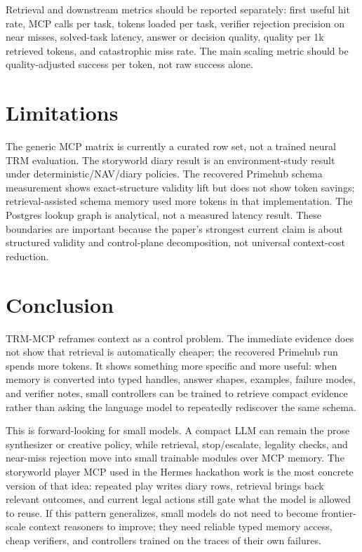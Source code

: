 \documentclass[11pt]{article}
\begin{document}
Retrieval and downstream metrics should be reported separately: first useful hit rate, MCP calls per task, tokens loaded per task, verifier rejection precision on near misses, solved-task latency, answer or decision quality, quality per 1k retrieved tokens, and catastrophic miss rate. The main scaling metric should be quality-adjusted success per token, not raw success alone.

\section{Limitations}

The generic MCP matrix is currently a curated row set, not a trained neural TRM evaluation. The storyworld diary result is an environment-study result under deterministic/NAV/diary policies. The recovered Primehub schema measurement shows exact-structure validity lift but does not show token savings; retrieval-assisted schema memory used more tokens in that implementation. The Postgres lookup graph is analytical, not a measured latency result. These boundaries are important because the paper's strongest current claim is about structured validity and control-plane decomposition, not universal context-cost reduction.

\section{Conclusion}

TRM-MCP reframes context as a control problem. The immediate evidence does not show that retrieval is automatically cheaper; the recovered Primehub run spends more tokens. It shows something more specific and more useful: when memory is converted into typed handles, answer shapes, examples, failure modes, and verifier notes, small controllers can be trained to retrieve compact evidence rather than asking the language model to repeatedly rediscover the same schema.

This is forward-looking for small models. A compact LLM can remain the prose synthesizer or creative policy, while retrieval, stop/escalate, legality checks, and near-miss rejection move into small trainable modules over MCP memory. The storyworld player MCP used in the Hermes hackathon work is the most concrete version of that idea: repeated play writes diary rows, retrieval brings back relevant outcomes, and current legal actions still gate what the model is allowed to reuse. If this pattern generalizes, small models do not need to become frontier-scale context reasoners to improve; they need reliable typed memory access, cheap verifiers, and controllers trained on the traces of their own failures.
\end{document}
